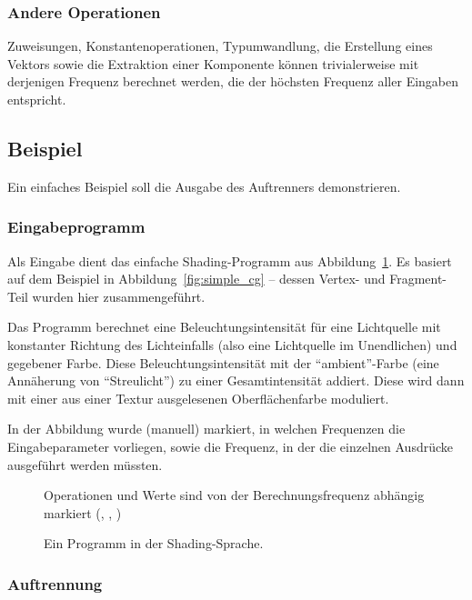 \documentclass[twoside,a4paper,fleqn,12pt]{book}
\begin{document}
\subsubsection{Andere Operationen}

Zuweisungen, Konstantenoperationen, Typumwandlung, die Erstellung eines Vektors sowie
die Extraktion einer Komponente können trivialerweise mit derjenigen Frequenz berechnet werden, die der höchsten Frequenz
aller Eingaben entspricht.

\subsection{Beispiel}

Ein einfaches Beispiel soll die Ausgabe des Auftrenners demonstrieren.

\subsubsection{Eingabeprogramm}

Als Eingabe dient das einfache Shading-Programm aus Abbildung~\ref{fig:simple_s1}.
Es basiert auf dem Beispiel in Abbildung~\ref{fig:simple_cg} -- dessen Vertex- und Fragment-Teil wurden hier zusammengeführt.

Das Programm berechnet eine Beleuchtungsintensität für eine Lichtquelle mit konstanter Richtung des Lichteinfalls (also eine Lichtquelle im
Unendlichen) und gegebener Farbe. Diese Beleuchtungsintensität mit der ``ambient''-Farbe (eine Annäherung von "`Streulicht"')
zu einer Gesamtintensität addiert. Diese wird dann mit einer aus einer Textur ausgelesenen Oberflächenfarbe moduliert.

In der Abbildung wurde (manuell) markiert, in welchen Frequenzen die Eingabeparameter vorliegen,
sowie die Frequenz, in der die einzelnen Ausdrücke ausgeführt werden müssten.

\begin{figure}[ht]
  
  \caption{Ein Programm in der Shading-Sprache.}
  \centering
  \small Operationen und Werte sind von der Berechnungsfrequenz abhängig markiert (, , )
  \label{fig:simple_s1}
\end{figure}

\subsubsection{Auftrennung}
\end{document}
